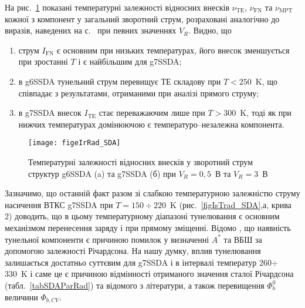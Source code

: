 На рис.~\ref{figeIrRad_SDA} показані температурні залежності відносних внесків $\nu_\mathrm{TE}$, $\nu_\mathrm{FN}$ та $\nu_\mathrm{MPT}$
кожної з компонент у загальний зворотний струм, розраховані аналогічно до виразів, наведених на с.~\pageref{nu_IR} при певних значеннях $V_R$.
Видно, що
\begin{enumerate}[label=\asbuk*),leftmargin=0em,itemindent=1.5em]
\item струм $I_\mathrm{FN}$ є основним при низьких температурах, його внесок зменшується при зростанні $T$ і є найбільшим для g7SSDA;
\item в g6SSDA тунельний струм перевищує ТЕ складову при $T<250$~K, що співпадає з результатами, отриманими при аналізі прямого струму;
\item в g7SSDA внесок $I_\mathrm{TE}$ стає переважаючим лише при $T>300$~K, тоді як при нижчих температурах домінюючою є температуро--незалежна компонента.
\end{enumerate}

\begin{figure}
\center
\texttt{[image: figeIrRad\_SDA]}
\caption{\label{figeIrRad_SDA}
Температурні залежності відносних внесків у зворотний струм
структур g6SSDA (a) та g7SSDA (б)
при $V_R=0,5$~В та $V_R=3$~В
}%
\end{figure}

Зазначимо, що останній факт разом зі слабкою температурною залежністю струму насичення ВТКС g7SSDA при $T=150\div220$~K (рис.~\ref{figIsTrad_SDA},а, крива 2)
доводить, що в цьому температурному діапазоні тунелювання є основним механізмом перенесення заряду і при прямому зміщенні.
Відомо \cite{Yu}, що наявність тунельної компоненти є причиною помилок у визначенні $A^*$ та ВБШ за допомогою залежності Річардсона.
На нашу думку, вплив тунелювання залишається достатньо суттєвим для g7SSDA і в інтервалі температур 260$\div$330~K і саме це є причиною
відмінності отриманого значення сталої Річардсона (табл.~\ref{tabSDAParRad}) та відомого з літератури, а також перевищення $\Phi_b^0$ величини $\Phi_{b,CV}$.

